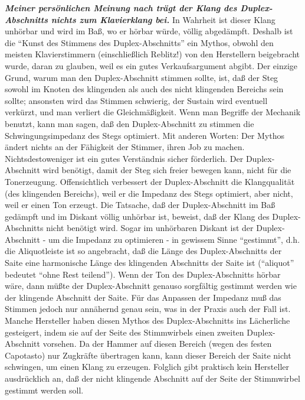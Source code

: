 \textbf{\textit{Meiner persönlichen Meinung nach trägt der Klang des Duplex-Abschnitts nichts zum Klavierklang bei.}}
In Wahrheit ist dieser Klang unhörbar und wird im Baß, wo er hörbar würde, völlig abgedämpft.
Deshalb ist die \enquote{Kunst des Stimmens des Duplex-Abschnitts} ein Mythos, obwohl den meisten Klavierstimmern (einschließlich Reblitz!) von den Herstellern beigebracht wurde, daran zu glauben, weil es ein gutes Verkaufsargument abgibt.
Der einzige Grund, warum man den Duplex-Abschnitt stimmen sollte, ist, daß der Steg sowohl im Knoten des klingenden als auch des nicht klingenden Bereichs sein sollte; ansonsten wird das Stimmen schwierig, der Sustain wird eventuell verkürzt, und man verliert die Gleichmäßigkeit.
Wenn man Begriffe der Mechanik benutzt, kann man sagen, daß den Duplex-Abschnitt zu stimmen die Schwingungsimpedanz des Stegs optimiert.
Mit anderen Worten: Der Mythos ändert nichts an der Fähigkeit der Stimmer, ihren Job zu machen.
Nichtsdestoweniger ist ein gutes Verständnis sicher förderlich.
Der Duplex-Abschnitt wird benötigt, damit der Steg sich freier bewegen kann, nicht für die Tonerzeugung.
Offensichtlich verbessert der Duplex-Abschnitt die Klangqualität (des klingenden Bereichs), weil er die Impedanz des Stegs optimiert, aber nicht, weil er einen Ton erzeugt.
Die Tatsache, daß der Duplex-Abschnitt im Baß gedämpft und im Diskant völlig unhörbar ist, beweist, daß der Klang des Duplex-Abschnitts nicht benötigt wird.
Sogar im unhörbaren Diskant ist der Duplex-Abschnitt - um die Impedanz zu optimieren - in gewissem Sinne \enquote{gestimmt}, d.h. die Aliquotleiste ist so angebracht, daß die Länge des Duplex-Abschnitts der Saite eine harmonische Länge des klingenden Abschnitts der Saite ist (\enquote{aliquot} bedeutet \enquote{ohne Rest teilend}).
Wenn der Ton des Duplex-Abschnitts hörbar wäre, dann müßte der Duplex-Abschnitt genauso sorgfältig gestimmt werden wie der klingende Abschnitt der Saite.
Für das Anpassen der Impedanz muß das Stimmen jedoch nur annähernd genau sein, was in der Praxis auch der Fall ist.
Manche Hersteller haben diesen Mythos des Duplex-Abschnitts ins Lächerliche gesteigert, indem sie auf der Seite des Stimmwirbels einen zweiten Duplex-Abschnitt vorsehen.
Da der Hammer auf diesen Bereich (wegen des festen Capotasto) nur Zugkräfte übertragen kann, kann dieser Bereich der Saite nicht schwingen, um einen Klang zu erzeugen.
Folglich gibt praktisch kein Hersteller ausdrücklich an, daß der nicht klingende Abschnitt auf der Seite der Stimmwirbel gestimmt werden soll.


\hypertarget{c2_5h}{}
